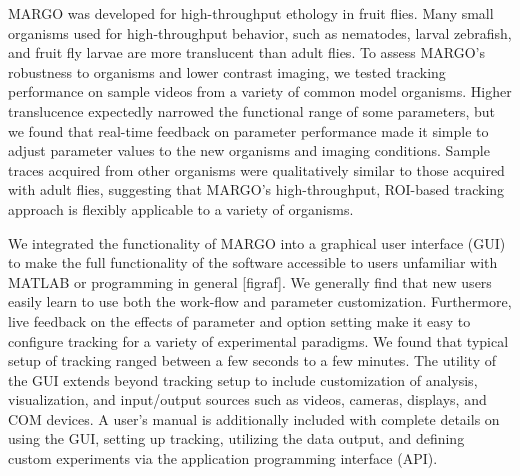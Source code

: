 \documentclass[10pt]{article}
\begin{document}
\begin{multicols}{2}
MARGO was developed for high-throughput ethology in fruit flies. Many small organisms used for high-throughput behavior, such as nematodes, larval zebrafish, and fruit fly larvae are more translucent than adult flies. To assess MARGO’s robustness to organisms and lower contrast imaging, we tested tracking performance on sample videos from a variety of common model organisms. Higher translucence expectedly narrowed the functional range of some parameters, but we found that real-time feedback on parameter performance made it simple to adjust parameter values to the new organisms and imaging conditions. Sample traces acquired from other organisms were qualitatively similar to those acquired with adult flies, suggesting that MARGO’s high-throughput, ROI-based tracking approach is flexibly applicable to a variety of organisms. 

We integrated the functionality of MARGO into a graphical user interface (GUI) to make the full functionality of the software accessible to users unfamiliar with MATLAB or programming in general [figraf]. We generally find that new users easily learn to use both the work-flow and parameter customization. Furthermore, live feedback on the effects of parameter and option setting make it easy to configure tracking for a variety of experimental paradigms. We found that typical setup of tracking ranged between a few seconds to a few minutes. The utility of the GUI extends beyond tracking setup to include customization of analysis, visualization, and input/output sources such as videos, cameras, displays, and COM devices. A user's manual is additionally included with complete details on using the GUI, setting up tracking, utilizing the data output, and defining custom experiments via the application programming interface (API).


\end{multicols}
\end{document}
